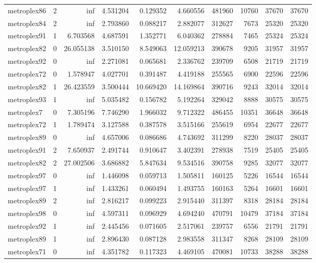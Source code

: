 \begin{longtable}{|l|r|r|r|r|r|r|r|r|r|}
metroplex86 & 2 & inf & 4.531204 & 0.129352 & 4.660556 & 481960 & 10760 & 37670 & 37670 \\
metroplex84 & 2 & inf & 2.793860 & 0.088217 & 2.882077 & 312627 & 7673 & 25320 & 25320 \\
metroplex91 & 1 & 6.703568 & 4.687591 & 1.352771 & 6.040362 & 278884 & 7465 & 25324 & 25324 \\
metroplex82 & 0 & 26.055138 & 3.510150 & 8.549063 & 12.059213 & 390678 & 9205 & 31957 & 31957 \\
metroplex92 & 0 & inf & 2.271081 & 0.065681 & 2.336762 & 239709 & 6508 & 21719 & 21719 \\
metroplex72 & 0 & 1.578947 & 4.027701 & 0.391487 & 4.419188 & 255565 & 6900 & 22596 & 22596 \\
metroplex82 & 1 & 26.423559 & 3.500444 & 10.669420 & 14.169864 & 390716 & 9243 & 32014 & 32014 \\
metroplex93 & 1 & inf & 5.035482 & 0.156782 & 5.192264 & 329042 & 8888 & 30575 & 30575 \\
metroplex7 & 0 & 7.305196 & 7.746290 & 1.966032 & 9.712322 & 486455 & 10351 & 36648 & 36648 \\
metroplex72 & 1 & 1.789474 & 3.127588 & 0.387578 & 3.515166 & 255619 & 6954 & 22677 & 22677 \\
metroplex89 & 0 & inf & 4.657006 & 0.086686 & 4.743692 & 311299 & 8220 & 28037 & 28037 \\
metroplex91 & 2 & 7.650937 & 2.491744 & 0.910647 & 3.402391 & 278938 & 7519 & 25405 & 25405 \\
metroplex82 & 2 & 27.002506 & 3.686882 & 5.847634 & 9.534516 & 390758 & 9285 & 32077 & 32077 \\
metroplex97 & 0 & inf & 1.446098 & 0.059713 & 1.505811 & 160125 & 5226 & 16544 & 16544 \\
metroplex97 & 1 & inf & 1.433261 & 0.060494 & 1.493755 & 160163 & 5264 & 16601 & 16601 \\
metroplex89 & 2 & inf & 2.816217 & 0.099223 & 2.915440 & 311397 & 8318 & 28184 & 28184 \\
metroplex98 & 0 & inf & 4.597311 & 0.096929 & 4.694240 & 470791 & 10479 & 37184 & 37184 \\
metroplex92 & 1 & inf & 2.445456 & 0.071605 & 2.517061 & 239757 & 6556 & 21791 & 21791 \\
metroplex89 & 1 & inf & 2.896430 & 0.087128 & 2.983558 & 311347 & 8268 & 28109 & 28109 \\
metroplex71 & 0 & inf & 4.351782 & 0.117323 & 4.469105 & 470081 & 10733 & 38288 & 38288 \\

\end{longtable}
